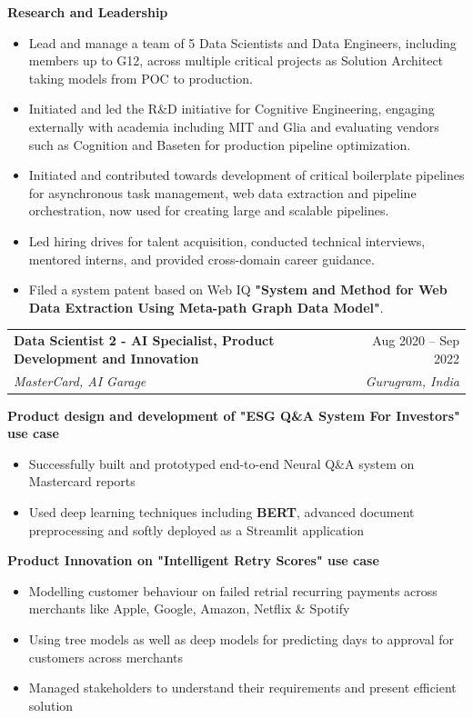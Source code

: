 \documentclass[letterpaper,11pt]{article}
\makeatletter
\newcommand{\resumeSubheading}[4]{
  \vspace{-2pt}\item
    \begin{tabular*}{0.97\textwidth}[t]{l@{\extracolsep{\fill}}r}
      \textbf{#1} & #2 \\
      \textit{\small#3} & \textit{\small #4} \\
    \end{tabular*}\vspace{-7pt}
}
\newcommand{\resumeProjectItem}[1]{
  \item\footnotesize{
    {#1 \vspace{-2pt}}
  }
}
\newcommand{\resumeProjectListStart}{\begin{itemize}[leftmargin=0.3in]}
\newcommand{\resumeProjectListEnd}{\end{itemize}\vspace{-3pt}}
\makeatother
\begin{document}
      \vspace{3pt}
      \textbf{Research and Leadership}
      \resumeProjectListStart
        \resumeProjectItem{Lead and manage a team of 5 Data Scientists and Data Engineers, including members up to G12, across multiple critical projects as Solution Architect taking models from POC to production.}
        \resumeProjectItem{Initiated and led the R\&D initiative for Cognitive Engineering, engaging externally with academia including MIT and Glia and evaluating vendors such as Cognition and Baseten for production pipeline optimization.}
        \resumeProjectItem{Initiated and contributed towards development of critical boilerplate pipelines for asynchronous task management, web data extraction and pipeline orchestration, now used for creating large and scalable pipelines.}
        \resumeProjectItem{Led hiring drives for talent acquisition, conducted technical interviews, mentored interns, and provided cross-domain career guidance.}
        \resumeProjectItem{Filed a system patent based on Web IQ \textbf{"System and Method for Web Data Extraction Using Meta-path Graph Data Model"}.}
      \resumeProjectListEnd
    \vspace{10pt}
    \resumeSubheading
      {Data Scientist 2 - AI Specialist, Product Development and Innovation}{Aug 2020 -- Sep 2022}
      {MasterCard, AI Garage}{Gurugram, India}
      
      \vspace{10pt}
      \textbf{Product design and development of "ESG Q\&A System For Investors" use case}
      \resumeProjectListStart
        \resumeProjectItem{Successfully built and prototyped end-to-end Neural Q\&A system on Mastercard reports}
        \resumeProjectItem{Used deep learning techniques including \textbf{BERT}, advanced document preprocessing and softly deployed as a Streamlit application}
      \resumeProjectListEnd
      
      \vspace{3pt}
      \textbf{Product Innovation on "Intelligent Retry Scores" use case}
      \resumeProjectListStart
        \resumeProjectItem{Modelling customer behaviour on failed retrial recurring payments across merchants like Apple, Google, Amazon, Netflix \& Spotify}
        \resumeProjectItem{Using tree models as well as deep models for predicting days to approval for customers across merchants}
        \resumeProjectItem{Managed stakeholders to understand their requirements and present efficient solution}
      \resumeProjectListEnd
      
\end{document}
